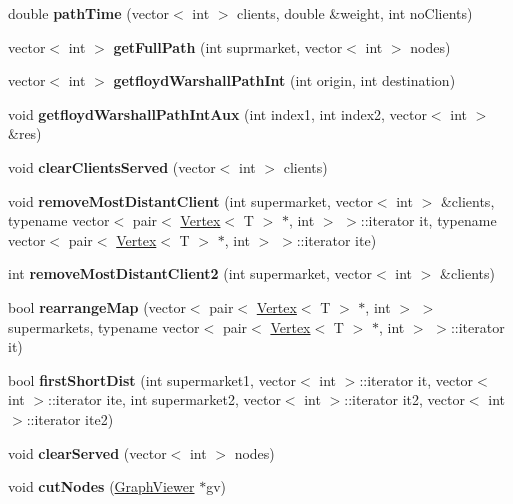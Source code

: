 \begin{DoxyCompactItemize}
\hypertarget{class_graph_aa2ca7a7a0678c8ca859bd1368dbf0849}{}\label{class_graph_aa2ca7a7a0678c8ca859bd1368dbf0849} 
double {\bfseries path\+Time} (vector$<$ int $>$ clients, double \&weight, int no\+Clients)
\item 
\hypertarget{class_graph_a467029922763bd5caf6dacce4314dad8}{}\label{class_graph_a467029922763bd5caf6dacce4314dad8} 
vector$<$ int $>$ {\bfseries get\+Full\+Path} (int suprmarket, vector$<$ int $>$ nodes)
\item 
\hypertarget{class_graph_a8e6b4bdc2c97b01d8e5bca1fa7496aec}{}\label{class_graph_a8e6b4bdc2c97b01d8e5bca1fa7496aec} 
vector$<$ int $>$ {\bfseries getfloyd\+Warshall\+Path\+Int} (int origin, int destination)
\item 
\hypertarget{class_graph_a3403fb95fb040c4b4623c0b6ac46737d}{}\label{class_graph_a3403fb95fb040c4b4623c0b6ac46737d} 
void {\bfseries getfloyd\+Warshall\+Path\+Int\+Aux} (int index1, int index2, vector$<$ int $>$ \&res)
\item 
\hypertarget{class_graph_a46a2760c361bc1be61fe09baf3f1e7e4}{}\label{class_graph_a46a2760c361bc1be61fe09baf3f1e7e4} 
void {\bfseries clear\+Clients\+Served} (vector$<$ int $>$ clients)
\item 
\hypertarget{class_graph_a66eacb93463220b68d78c4c72ac334ae}{}\label{class_graph_a66eacb93463220b68d78c4c72ac334ae} 
void {\bfseries remove\+Most\+Distant\+Client} (int supermarket, vector$<$ int $>$ \&clients, typename vector$<$ pair$<$ \hyperlink{class_vertex}{Vertex}$<$ T $>$ $\ast$, int $>$ $>$\+::iterator it, typename vector$<$ pair$<$ \hyperlink{class_vertex}{Vertex}$<$ T $>$ $\ast$, int $>$ $>$\+::iterator ite)
\item 
\hypertarget{class_graph_a1d85759a1be487ddf83d19bcff1d32e6}{}\label{class_graph_a1d85759a1be487ddf83d19bcff1d32e6} 
int {\bfseries remove\+Most\+Distant\+Client2} (int supermarket, vector$<$ int $>$ \&clients)
\item 
\hypertarget{class_graph_a4ddd35dbd53ec1ea2b1b47ec9da10af9}{}\label{class_graph_a4ddd35dbd53ec1ea2b1b47ec9da10af9} 
bool {\bfseries rearrange\+Map} (vector$<$ pair$<$ \hyperlink{class_vertex}{Vertex}$<$ T $>$ $\ast$, int $>$ $>$ supermarkets, typename vector$<$ pair$<$ \hyperlink{class_vertex}{Vertex}$<$ T $>$ $\ast$, int $>$ $>$\+::iterator it)
\item 
\hypertarget{class_graph_ae059b5069ac2d98c2a4ed3eb7ad802ca}{}\label{class_graph_ae059b5069ac2d98c2a4ed3eb7ad802ca} 
bool {\bfseries first\+Short\+Dist} (int supermarket1, vector$<$ int $>$\+::iterator it, vector$<$ int $>$\+::iterator ite, int supermarket2, vector$<$ int $>$\+::iterator it2, vector$<$ int $>$\+::iterator ite2)
\item 
\hypertarget{class_graph_af24585d15c94c28449525abc8252bbf6}{}\label{class_graph_af24585d15c94c28449525abc8252bbf6} 
void {\bfseries clear\+Served} (vector$<$ int $>$ nodes)
\item 
\hypertarget{class_graph_a710e55795802d58979bc5539911ad422}{}\label{class_graph_a710e55795802d58979bc5539911ad422} 
void {\bfseries cut\+Nodes} (\hyperlink{class_graph_viewer}{Graph\+Viewer} $\ast$gv)
\end{DoxyCompactItemize}
